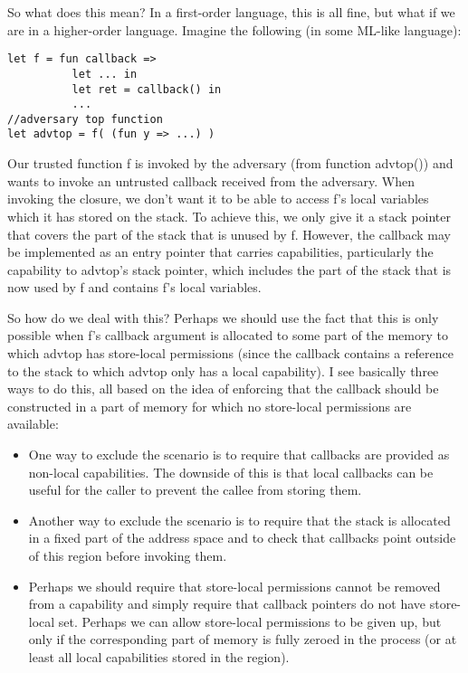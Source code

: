 \documentclass{article}
\begin{document}
So what does this mean? In a first-order language, this is all fine, but what if
we are in a higher-order language. Imagine the following (in some ML-like language):

\begin{verbatim}
let f = fun callback =>
          let ... in 
          let ret = callback() in
          ...
//adversary top function
let advtop = f( (fun y => ...) )
\end{verbatim}

Our trusted function f is invoked by the adversary (from function advtop()) and
wants to invoke an untrusted callback received from the adversary. When invoking
the closure, we don't want it to be able to access f's local variables which it
has stored on the stack. To achieve this, we only give it a stack pointer that
covers the part of the stack that is unused by f. However, the callback may be
implemented as an entry pointer that carries capabilities, particularly the
capability to advtop's stack pointer, which includes the part of the stack that
is now used by f and contains f's local variables.

So how do we deal with this? Perhaps we should use the fact that this is only
possible when f's callback argument is allocated to some part of the memory to
which advtop has store-local permissions (since the callback contains a
reference to the stack to which advtop only has a local capability). I see
basically three ways to do this, all based on the idea of enforcing that the
callback should be constructed in a part of memory for which no store-local
permissions are available:
\begin{itemize}
\item One way to exclude the scenario is to require that callbacks are provided
  as non-local capabilities. The downside of this is that local callbacks can be
  useful for the caller to prevent the callee from storing them.
\item Another way to exclude the scenario is to require that the stack is
  allocated in a fixed part of the address space and to check that callbacks
  point outside of this region before invoking them.
\item Perhaps we should require that store-local permissions cannot be removed
  from a capability and simply require that callback pointers do not have
  store-local set. Perhaps we can allow store-local permissions to be given up,
  but only if the corresponding part of memory is fully zeroed in the process
  (or at least all local capabilities stored in the region).
\end{itemize}
\end{document}
